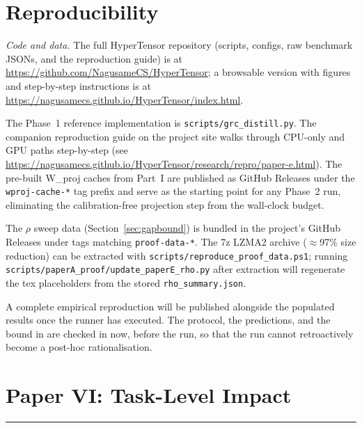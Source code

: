 \documentclass[11pt]{article}
\begin{document}
\section{Reproducibility}
\smallskip\noindent\textit{Code and data.} The full HyperTensor repository (scripts, configs, raw benchmark JSONs, and the reproduction guide) is at \url{https://github.com/NagusameCS/HyperTensor}; a browsable version with figures and step-by-step instructions is at \url{https://nagusamecs.github.io/HyperTensor/index.html}.

\label{sec:repro}

The Phase~1 reference implementation is \texttt{scripts/grc\_distill.py}.
The companion reproduction guide on the project site walks through CPU-only
and GPU paths step-by-step (see
\url{https://nagusamecs.github.io/HyperTensor/research/repro/paper-e.html}).
The pre-built W\_proj caches from Part~I are published as GitHub
Releases under the \texttt{wproj-cache-*} tag prefix and serve as the
starting point for any Phase~2 run, eliminating the calibration-free
projection step from the wall-clock budget.

The $\rho$ sweep data (Section~\ref{sec:gapbound}) is bundled in the
project's GitHub Releases under tags matching \texttt{proof-data-*}.
The 7z LZMA2 archive ($\approx$97\% size reduction) can be extracted with
\texttt{scripts/reproduce\_proof\_data.ps1}; running
\texttt{scripts/paperA\_proof/update\_paperE\_rho.py} after extraction
will regenerate the tex placeholders from the stored
\texttt{rho\_summary.json}.

A complete empirical reproduction will be published alongside the
populated results once the runner has executed. The protocol, the
predictions, and the bound in  are checked in now,
before the run, so that the run cannot retroactively become a
post-hoc rationalisation.

\clearpage
\printbibliography

\newpage



\newpage
\section{Paper VI: Task-Level Impact}
\vspace{6pt}
\hrule
\vspace{12pt}
\end{document}
